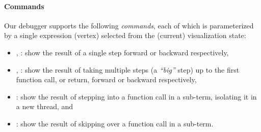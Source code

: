 
\paragraph{Commands}
Our debugger supports the following \emph{commands}, each of which
is parameterized by a single expression (vertex) selected from the
(current) visualization state:
%
\begin{itemize}
%
\item \stepforwardsym, \stepbackwardsym:
      show the result of a single step forward or backward respectively,
%
\item \jumpforwardsym, \jumpbackwardsym:
      show the result of taking multiple steps (a \emph{``big''} step)
      up to the first function call, or return, forward or backward
      respectively,
%
\item \stepintosym:
      show the result of stepping into a function call in a sub-term,
      isolating it in a new thread, and
%
\item \stepoversym:
      show the result of skipping over a function call in a sub-term.
\end{itemize}


